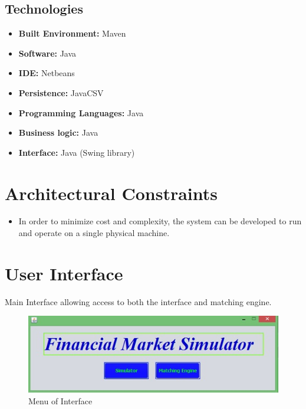 \documentclass[12pt]{article}
\begin{document}
                \subsection{Technologies}
                    \begin{itemize}
                        \item \textbf{Built Environment:} Maven
                        \item \textbf{Software:} Java
                        \item \textbf{IDE:} Netbeans
                        \item \textbf{Persistence:} JavaCSV
                        \item \textbf{Programming Languages:} Java
                        \item \textbf{Business logic:} Java
                        \item \textbf{Interface:} Java (Swing library)
                    \end{itemize}

		\section{Architectural Constraints}
		\begin{itemize}
		\item In order to minimize cost and complexity, the system can be developed to run and operate on a single physical machine. 
		\end{itemize}

        \newpage
	\section{User Interface}
           Main Interface allowing access to both the interface and matching engine.
            
            \begin{figure}[th]
             \centering
             \includegraphics[scale=0.8]{maininterface}
             \caption{Menu of Interface}
             \label{Main Interface}
            \end{figure}
            
\end{document}
